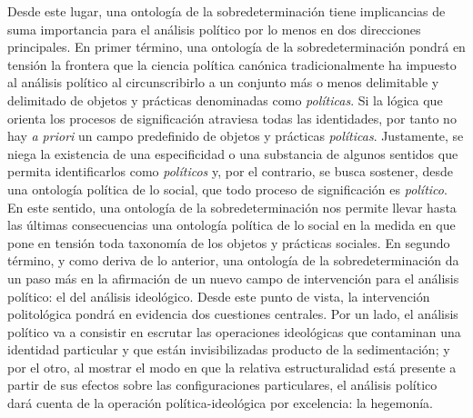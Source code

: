 Desde este lugar, una ontología de la sobredeterminación tiene implicancias de suma importancia para el análisis político por lo menos en dos direcciones principales. En primer término, una ontología de la sobredeterminación pondrá en tensión la frontera que la ciencia política canónica tradicionalmente ha impuesto al análisis político al circunscribirlo a un conjunto más o menos delimitable y delimitado de objetos y prácticas denominadas como \emph{políticas}. Si la lógica que orienta los procesos de significación  atraviesa todas las identidades, por tanto no hay \emph{a priori} un campo predefinido de objetos y prácticas \emph{políticas}. Justamente, se niega la existencia de una especificidad o una substancia de algunos sentidos que permita identificarlos como \emph{políticos} y, por el contrario, se busca sostener, desde una ontología política de lo social, que todo proceso de significación es \emph{político}. En este sentido, una ontología de la sobredeterminación nos permite llevar hasta las últimas consecuencias una ontología política de lo social en la medida en que pone en tensión toda taxonomía de los objetos y prácticas sociales. En segundo término, y como deriva de lo anterior, una ontología de la sobredeterminación da un paso más en la afirmación de un nuevo campo de intervención para el análisis político: el del análisis ideológico. Desde este punto de vista, la intervención politológica pondrá en evidencia dos cuestiones centrales. Por un lado, el análisis político va a consistir en escrutar las operaciones ideológicas que contaminan una identidad particular y que están invisibilizadas producto de la sedimentación; y por el otro, al mostrar el modo en que la relativa estructuralidad está presente a partir de sus efectos sobre las configuraciones particulares, el análisis político dará cuenta de la operación política-ideológica por excelencia: la hegemonía.

